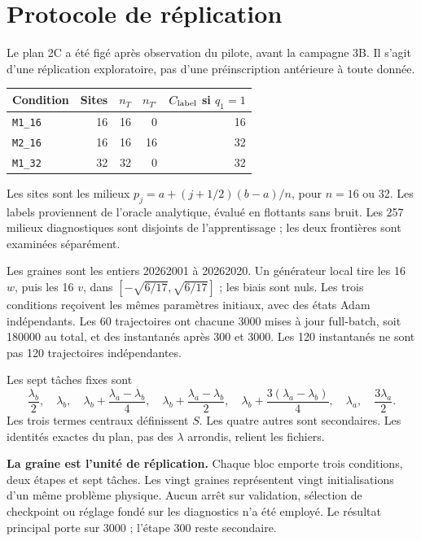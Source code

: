 \documentclass[11pt,a4paper]{article}
\newcommand{\Mone}{\texttt{M1\_16}}\newcommand{\Mtwo}{\texttt{M2\_16}}
\newcommand{\Mthree}{\texttt{M1\_32}}\newcommand{\That}{\widehat T_\theta}
\begin{document}
\clearpage
\section{Protocole de réplication}
\label{sec:protocole}
Le plan 2C a été figé après observation du pilote, avant la campagne 3B.
Il s'agit d'une réplication exploratoire, pas d'une préinscription antérieure
à toute donnée.
\begin{center}
\begin{tabular}{lrrrr}
\toprule
Condition & Sites & $n_T$ & $n_{T'}$ & $C_{\rm label}$ si $q_1=1$\\
\midrule
\Mone & 16 & 16 & 0 & 16\\
\Mtwo & 16 & 16 & 16 & 32\\
\Mthree & 32 & 32 & 0 & 32\\
\bottomrule
\end{tabular}
\end{center}
Les sites sont les milieux $p_j=a+(j+1/2)(b-a)/n$, pour $n=16$ ou 32.
Les labels proviennent de l'oracle analytique, évalué en flottants sans bruit.
Les 257 milieux diagnostiques sont disjoints de l'apprentissage ; les deux
frontières sont examinées séparément.

Les graines sont les entiers 20262001 à 20262020. Un générateur local tire
les 16 $w$, puis les 16 $v$, dans $[-\sqrt{6/17},\sqrt{6/17}]$ ;
les biais sont nuls. Les trois conditions reçoivent les mêmes paramètres
initiaux, avec des états Adam indépendants.
Les 60 trajectoires ont chacune 3000 mises à jour full-batch,
soit 180000 au total, et des instantanés après 300 et 3000.
Les 120 instantanés ne sont pas 120 trajectoires indépendantes.

Les sept tâches fixes sont
\[
\frac{\lambda_b}{2},\quad\lambda_b,\quad
\lambda_b+\frac{\lambda_a-\lambda_b}{4},\quad
\lambda_b+\frac{\lambda_a-\lambda_b}{2},\quad
\lambda_b+\frac{3(\lambda_a-\lambda_b)}4,\quad
\lambda_a,\quad\frac{3\lambda_a}{2}.
\]
Les trois termes centraux définissent $S$. Les quatre autres sont secondaires.
Les identités exactes du plan, pas des $\lambda$ arrondis, relient les fichiers.

\textbf{La graine est l'unité de réplication.} Chaque bloc emporte trois
conditions, deux étapes et sept tâches. Les vingt graines représentent
vingt initialisations d'un même problème physique.
Aucun arrêt sur validation, sélection de checkpoint ou réglage fondé
sur les diagnostics n'a été employé. Le résultat principal porte sur 3000 ;
l'étape 300 reste secondaire.
\end{document}
